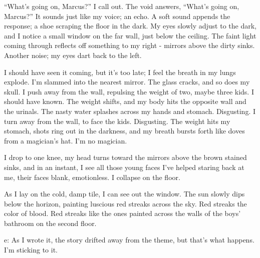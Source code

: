 ``What's going on, Marcus?'' I call out. The void answers, ``What's
going on, Marcus?'' It sounds just like my voice; an echo. A soft
sound appends the response; a shoe scraping the floor in the dark.
My eyes slowly adjust to the dark, and I notice a small window on
the far wall, just below the ceiling. The faint light coming
through reflects off something to my right - mirrors above the
dirty sinks. Another noise; my eyes dart back to the left.



I should have seen it coming, but it's too late; I feel the breath
in my lungs explode. I'm slammed into the nearest mirror. The glass
cracks, and so does my skull. I push away from the wall, repulsing
the weight of two, maybe three kids. I should have known. The
weight shifts, and my body hits the opposite wall and the urinals.
The nasty water splashes across my hands and stomach. Disgusting. I
turn away from the wall, to face the kids. Disgusting. The weight
hits my stomach, shots ring out in the darkness, and my breath
bursts forth like doves from a magician's hat. I'm no
magician.



I drop to one knee, my head turns toward the mirrors above the
brown stained sinks, and in an instant, I see all those young faces
I've helped staring back at me, their faces blank, emotionless. I
collapse on the floor.



As I lay on the cold, damp tile, I can see out the window. The sun
slowly dips below the horizon, painting luscious red streaks across
the sky. Red streaks the color of blood. Red streaks like the ones
painted across the walls of the boys' bathroom on the second
floor.





e: As I wrote it, the story drifted away from the theme, but that's
what happens. I'm sticking to it. 
 






